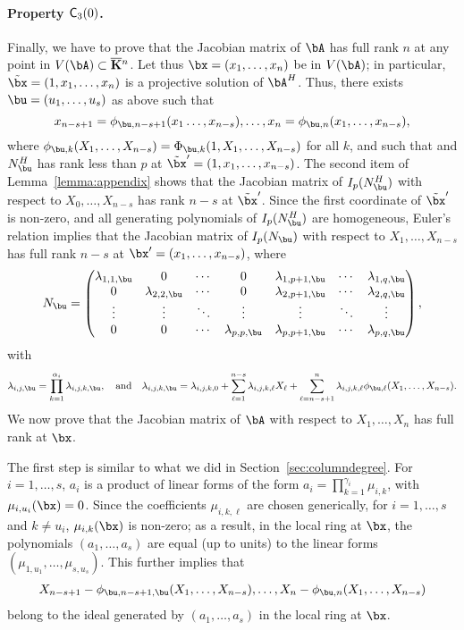 \documentclass[12pt]{article}
\begin{document}
\paragraph{Property $\mathsf{C}_3(0)$.} Finally, we have to prove that the Jacobian
matrix of $\bA$ has full rank $n$ at any point in $V(\bA) \subset
\KKbar{}^n$. Let thus $\bx=(x_1,\dots,x_n)$ be in $V(\bA)$; in
particular, $\tilde \bx=(1,x_1,\dots,x_n)$ is a projective solution of
$\bA^H$.  Thus, there exists $\bu=(u_1,\dots,u_s)$ as above such that
$$x_{n-s+1}=\phi_{\bu,n-s+1}(x_1\dots,x_{n-s}),\dots,x_{n}=\phi_{\bu,n}(x_1,\dots,x_{n-s}),$$
where $\phi_{\bu,k}(X_1,\dots,X_{n-s})=\Phi_{\bu,k}(1,X_1,\dots,X_{n-s})$ for 
all $k$, and such that
and $\mN^H_\bu$ has rank less than $p$ at $\tilde\bx'=(1,x_1,\dots,x_{n-s})$.  The second item of
Lemma~\ref{lemma:appendix} shows that the Jacobian matrix of
$I_p(\mN^H_\bu)$ with respect to $X_0,\dots,X_{n-s}$ has rank $n-s$
at $\tilde \bx'$. Since the first coordinate of $\tilde\bx'$ is non-zero,
and all generating polynomials of $I_p(\mN^H_\bu)$ are homogeneous,
Euler's relation implies that the Jacobian matrix of $I_p(\mN_\bu)$
with respect to $X_1,\dots,X_{n-s}$
has full rank $n-s$ at $\bx'=(x_1,\dots,x_{n-s})$, where  
\begin{align}\label{eqdef:Lu}
 \mN_\bu = \left( \begin{matrix}
\lambda_{1,1,\bu} & 0 & \cdots & 0 & \lambda_{1,p+1,\bu} & \cdots & \lambda_{1, q,\bu}\\
0 & \lambda_{2,2,\bu} & \cdots & 0 & \lambda_{2,p+1,\bu} & \cdots & \lambda_{2, q,\bu}\\
\vdots & \vdots & \ddots & \vdots & \vdots & \ddots & \vdots\\
0 & 0 & \cdots & \lambda_{p,p,\bu} & \lambda_{p,p+1,\bu} & \cdots & \lambda_{p, q,\bu}
\end{matrix} \right),
\end{align}
with
$$\lambda_{i,j,\bu}=\prod_{k=1}^{\alpha_i}\lambda_{i,j,k,\bu},
\quad\text{and}\quad \lambda_{i,j,k,\bu}=\lambda_{i,j,k,0}+\sum_{\ell
  = 1}^{n-s}\lambda_{i,j,k,\ell}X_\ell + \sum_{\ell =
  n-s+1}^{n}\lambda_{i,j,k,\ell}
\phi_{\bu,\ell}(X_1,\dots,X_{n-s}).$$ We now  prove
that the Jacobian matrix of $\bA$ with respect to $X_1,\dots,X_n$ has
full rank at $\bx$.

The first step is similar to what we did in Section~\ref{sec:columndegree}.  For
$i=1,\dots,s$, $a_i$ is a product of linear forms of the form
$a_i=\prod_{k=1}^{\gamma_i} \mu_{i,k}$, with $\mu_{i,u_i}(\bx)=0$.
Since the coefficients $\mu_{i,k,\ell}$ are chosen generically, for
$i=1,\dots,s$ and $k \ne u_i$, $\mu_{i,k}(\bx)$ is non-zero; as a
result, in the local ring at $\bx$, the polynomials $(a_1,\dots,a_s)$
are equal (up to units) to the linear forms
$(\mu_{1,u_1},\dots,\mu_{s,u_s})$. This further implies that
\begin{align}\label{eq:subst}
X_{n-s+1}-\phi_{\bu,n-s+1,\bu}(X_1,\dots,X_{n-s}),\dots,X_{n}-\phi_{\bu,n}(X_1,\dots,X_{n-s})
\end{align}
belong to the ideal generated by $(a_1,\dots,a_s)$ in the local 
ring at $\bx$.
\end{document}
